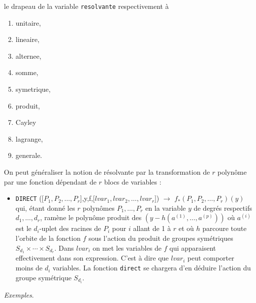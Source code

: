 \documentclass[11pt]{article}
\begin{document}
le drapeau de la variable {\tt resolvante} respectivement \`a 
\begin{enumerate}
\item unitaire,
\item lineaire,
\item alternee,
\item somme,
\item symetrique,
\item produit,
\item Cayley
\item lagrange,
\item generale.
\end{enumerate}
On peut g\'en\'eraliser la notion de r\'esolvante par la
transformation de $r$ polyn\^ome par une fonction d\'ependant de
$r$ blocs de variables :
\begin{itemize}
\item {\tt DIRECT} 
      ([$P_1,P_2,\ldots,P_r$],y,f,[$lvar_1,lvar_2,\ldots ,lvar_r$])
$\longrightarrow$ $f_*(P_1,P_2, \ldots, P_r)(y)$ \\
qui, \'etant donn\'e les $r$ polyn\^omes $P_1, \ldots, P_r$ en la variable
$y$ de 
degr\'es respectifs $d_1, \ldots , d_r$, ram\`ene
le polyn\^ome produit des $(y - h(a^{(1)}, \ldots, a^{(p)}))$ o\`u
$a^{(i)}$ est le $d_i$-uplet des racines de $P_i$ pour $i$ allant de 1
\`a $r$ et o\`u $h$ parcoure toute l'orbite de la fonction $f$ sous 
l'action du produit de groupes sym\'etriques
$S_{d_1}\times \cdots \times S_{d_r}$. Dans $lvar_i$ on met les variables
de $f$ qui apparaisent effectivement dans son expression. C'est \`a dire
que $lvar_i$ peut comporter moins de $d_i$ variables. La fonction
{\tt direct} se chargera d'en d\'eduire l'action du groupe
sym\'etrique $S_{d_i}$.
\end{itemize}
{\it Exemples}.
\small
\end{document}
